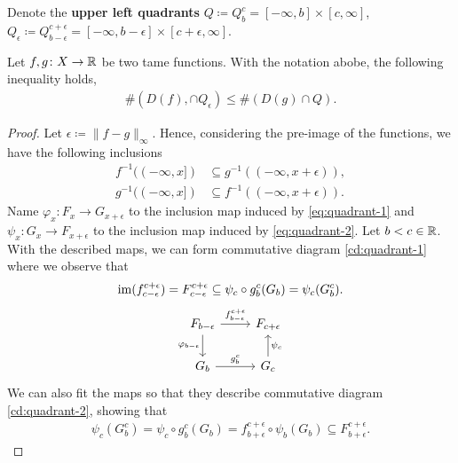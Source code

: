 Denote the {\bf upper left quadrants} $ Q \coloneq Q_b^c = [-\infty, b] \times [c, \infty] $, $ Q_\epsilon \coloneq Q_{b-\epsilon}^{c+\epsilon} = [-\infty, b-\epsilon] \times [c+\epsilon, \infty] $.



\begin{lemma} \label{lemma:quadrant-lemma}
    Let $f,g \colon X \to \mathbb R $ be two tame functions. With the notation abobe, the following inequality holds,
    \begin{align}
        \#(D(f), \cap Q_\epsilon) \leq \#(D(g) \cap Q).
    \end{align}
\end{lemma}
\begin{proof}
    Let $ \epsilon \coloneq \|f - g\|_\infty $. Hence, considering the pre-image of the functions, we have the following inclusions
    \begin{align}
        f^{-1}((-\infty, x]) &\subseteq g^{-1}((-\infty, x+\epsilon)), \label{eq:quadrant-1}\\
        g^{-1}((-\infty, x]) &\subseteq f^{-1}((-\infty, x+\epsilon)). \label{eq:quadrant-2}
    \end{align}
    Name $ \varphi_x \colon F_x \to G_{x+\epsilon} $  to the inclusion map induced by \eqref{eq:quadrant-1} and $ \psi_x \colon G_x \to F_{x+\epsilon} $ to the inclusion map induced by \eqref{eq:quadrant-2}. Let $ b<c \in \mathbb R $. With the described maps, we can form commutative diagram \eqref{cd:quadrant-1} where we observe that
    \begin{align} \label{eq:quadrant-3}
        \operatorname{im}(f_{c-\epsilon}^{c+\epsilon}) = F_{c-\epsilon}^{c+\epsilon} \subseteq \psi_c \circ g_b^c(G_b) = \psi_c (G_b^c).
    \end{align}
    \begin{equation} \label{cd:quadrant-1}
    \begin{tikzcd}
        F_{b-\epsilon} \arrow[r, "f_{b-\epsilon}^{c+\epsilon}"] \arrow[d, "\varphi_{b-\epsilon}"']
        & F_{c+\epsilon} \\
        G_b \arrow[r, "g_b^c"]
        & G_c \arrow[u, "\psi_c"']        
    \end{tikzcd}
    \end{equation}
    We can also fit the maps so that they describe commutative diagram \eqref{cd:quadrant-2}, showing that
    \begin{align}
        \psi_c(G_b^c) = \psi_c \circ g_b^c(G_b) = f_{b+\epsilon}^{c+\epsilon} \circ \psi_b(G_b) \subseteq F_{b+\epsilon}^{c+\epsilon}.

\end{align}
\end{proof}
